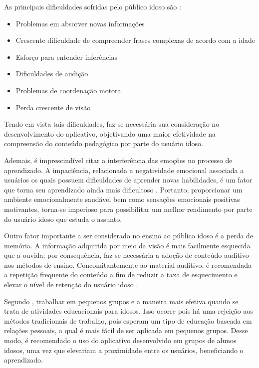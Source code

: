 As principais dificuldades sofridas pelo público idoso são \citep{euromed}:

\begin{itemize}
    \item Problemas em absorver novas informações
    \item Crescente dificuldade de compreender frases complexas de acordo com a idade
    \item Esforço para entender inferências
    \item Dificuldades de audição
    \item Problemas de coordenação motora
    \item Perda crescente de visão
\end{itemize}

Tendo em vista tais dificuldades, faz-se necessária sua consideração no desenvolvimento do aplicativo, objetivando uma maior efetividade na compreensão do conteúdo pedagógico por parte do usuário idoso.

Ademais, é imprescindível citar a interferência das emoções no processo de aprendizado. A impaciência, relacionada a negatividade emocional associada a usuários os quais possuem dificuldades de aprender novas habilidades, é um fator que torna seu aprendizado ainda mais dificultoso \citep{Edukacja}. Portanto, proporcionar um ambiente emocionalmente saudável bem como sensações emocionais positivas motivantes, torna-se imperioso para possibilitar um melhor rendimento por parte do usuário idoso que estuda o assunto.

Outro fator importante a ser considerado no ensino ao público idoso é a perda de memória. A informação adquirida por meio da visão é mais facilmente esquecida que a ouvida; por consequência,  faz-se necessária a adoção de conteúdo auditivo nos métodos de ensino. Concomitantemente ao material auditivo, é recomendada a repetição frequente do conteúdo a fim de reduzir a taxa de esquecimento e elevar o nível de retenção do usuário idoso \citep{euromed}.

Segundo \cite{Edukacja}, trabalhar em pequenos grupos e a maneira mais efetiva quando se trata de atividades educacionais para idosos. Isso ocorre pois há uma rejeição aos métodos tradicionais de trabalho, pois esperam um tipo de educação baseada em relações pessoais, a qual é mais fácil de ser aplicada em pequenos grupos. Desse modo, é recomendado o uso do aplicativo desenvolvido em grupos de alunos idosos, uma vez que elevariam a proximidade entre os usuários, beneficiando o aprendizado.

